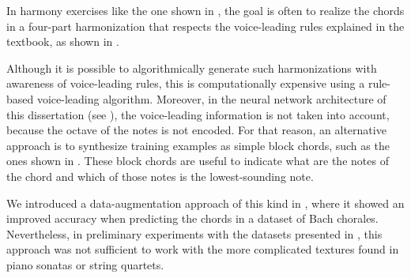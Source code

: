 
In harmony exercises like the one shown in
, the goal is often to
\gls{realize} the chords in a four-part harmonization that
respects the voice-leading rules explained in the textbook,
as shown in . 


Although it is possible to algorithmically generate such
harmonizations with awareness of voice-leading rules, this
is computationally expensive using a rule-based
voice-leading
algorithm.
Moreover, in the neural network architecture of this
dissertation (see ), the voice-leading
information is not taken into account, because the octave of
the notes is not encoded. For that reason, an alternative
approach is to synthesize training examples as simple block
chords, such as the ones shown in
. These block chords are useful
to indicate what are the notes of the chord and which of
those notes is the lowest-sounding note. 

We introduced a data-augmentation approach of this kind in
\textcite{napoleslopez2020harmonic}, where it showed an
improved accuracy when predicting the chords in a dataset of
Bach chorales. Nevertheless, in preliminary experiments with
the datasets presented in
, this approach was not
sufficient to work with the more complicated textures found
in piano sonatas or string quartets.

